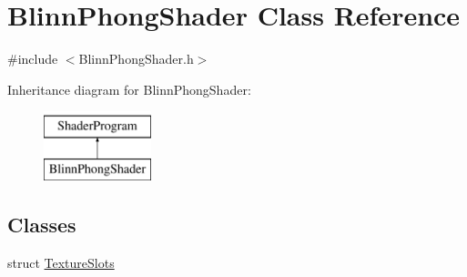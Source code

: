 \hypertarget{class_blinn_phong_shader}{}\section{Blinn\+Phong\+Shader Class Reference}
\label{class_blinn_phong_shader}


{\ttfamily \#include $<$Blinn\+Phong\+Shader.\+h$>$}

Inheritance diagram for Blinn\+Phong\+Shader\+:\begin{figure}[H]
\begin{center}
\leavevmode
\includegraphics[height=2.000000cm]{class_blinn_phong_shader}
\end{center}
\end{figure}
\subsection*{Classes}
\begin{DoxyCompactItemize}
\item 
struct \hyperlink{struct_blinn_phong_shader_1_1_texture_slots}{Texture\+Slots}
\end{DoxyCompactItemize}
